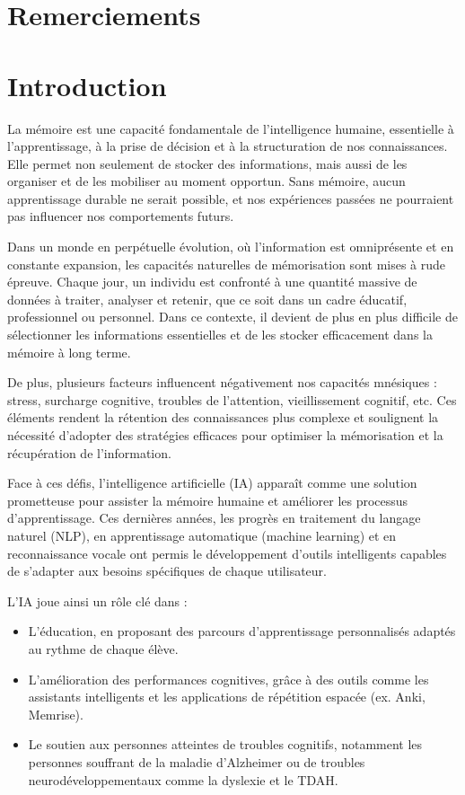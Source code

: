 \documentclass[12pt,a4paper]{report}
\begin{document}
\chapter*{Remerciements}

\chapter*{Introduction}

La mémoire est une capacité fondamentale de l’intelligence humaine, essentielle à l’apprentissage, à la prise de décision et à la structuration de nos connaissances. Elle permet non seulement de stocker des informations, mais aussi de les organiser et de les mobiliser au moment opportun. Sans mémoire, aucun apprentissage durable ne serait possible, et nos expériences passées ne pourraient pas influencer nos comportements futurs.

Dans un monde en perpétuelle évolution, où l’information est omniprésente et en constante expansion, les capacités naturelles de mémorisation sont mises à rude épreuve. Chaque jour, un individu est confronté à une quantité massive de données à traiter, analyser et retenir, que ce soit dans un cadre éducatif, professionnel ou personnel. Dans ce contexte, il devient de plus en plus difficile de sélectionner les informations essentielles et de les stocker efficacement dans la mémoire à long terme.

De plus, plusieurs facteurs influencent négativement nos capacités mnésiques : stress, surcharge cognitive, troubles de l’attention, vieillissement cognitif, etc. Ces éléments rendent la rétention des connaissances plus complexe et soulignent la nécessité d’adopter des stratégies efficaces pour optimiser la mémorisation et la récupération de l’information.

Face à ces défis, l’intelligence artificielle (IA) apparaît comme une solution prometteuse pour assister la mémoire humaine et améliorer les processus d’apprentissage. Ces dernières années, les progrès en traitement du langage naturel (NLP), en apprentissage automatique (machine learning) et en reconnaissance vocale ont permis le développement d’outils intelligents capables de s’adapter aux besoins spécifiques de chaque utilisateur.

L’IA joue ainsi un rôle clé dans :
\begin{itemize}

    \item L’éducation, en proposant des parcours d’apprentissage personnalisés adaptés au rythme de chaque élève.
    \item L’amélioration des performances cognitives, grâce à des outils comme les assistants intelligents et les applications de répétition espacée (ex. Anki, Memrise).
    \item Le soutien aux personnes atteintes de troubles cognitifs, notamment les personnes souffrant de la maladie d’Alzheimer ou de troubles neurodéveloppementaux comme la dyslexie et le TDAH.

\end{itemize}
\end{document}
